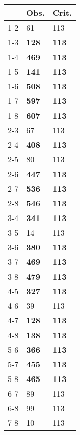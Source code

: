 \begin{table}[ht]
\centering
\begin{tabular}{rll}
  \hline
 & Obs. & Crit. \\ 
  \hline
1-2 & 61 & 113 \\ 
  1-3 & \textbf{128} & \textbf{113} \\ 
  1-4 & \textbf{469} & \textbf{113} \\ 
  1-5 & \textbf{141} & \textbf{113} \\ 
  1-6 & \textbf{508} & \textbf{113} \\ 
  1-7 & \textbf{597} & \textbf{113} \\ 
  1-8 & \textbf{607} & \textbf{113} \\ 
  2-3 & 67 & 113 \\ 
  2-4 & \textbf{408} & \textbf{113} \\ 
  2-5 & 80 & 113 \\ 
  2-6 & \textbf{447} & \textbf{113} \\ 
  2-7 & \textbf{536} & \textbf{113} \\ 
  2-8 & \textbf{546} & \textbf{113} \\ 
  3-4 & \textbf{341} & \textbf{113} \\ 
  3-5 & 14 & 113 \\ 
  3-6 & \textbf{380} & \textbf{113} \\ 
  3-7 & \textbf{469} & \textbf{113} \\ 
  3-8 & \textbf{479} & \textbf{113} \\ 
  4-5 & \textbf{327} & \textbf{113} \\ 
  4-6 & 39 & 113 \\ 
  4-7 & \textbf{128} & \textbf{113} \\ 
  4-8 & \textbf{138} & \textbf{113} \\ 
  5-6 & \textbf{366} & \textbf{113} \\ 
  5-7 & \textbf{455} & \textbf{113} \\ 
  5-8 & \textbf{465} & \textbf{113} \\ 
  6-7 & 89 & 113 \\ 
  6-8 & 99 & 113 \\ 
  7-8 & 10 & 113 \\ 
   \hline
\end{tabular}
\end{table}
